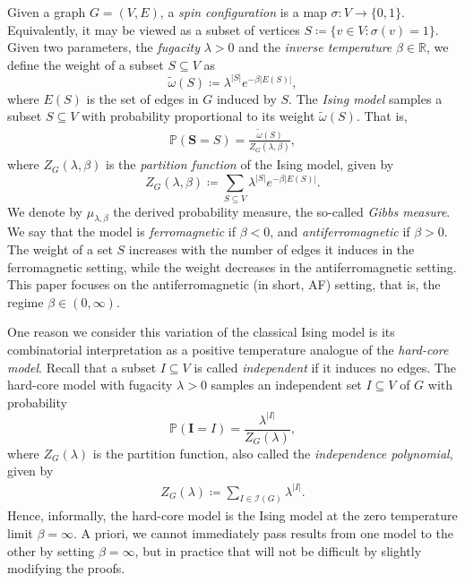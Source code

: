 \documentclass[reqno,a4paper,11pt]{amsart}
\newcommand{\cI}{\mathcal{I}}
\newcommand{\bI}{\mathbf{I}}
\newcommand{\lam}{\lambda}
\begin{document}
Given a graph $G=(V, E)$, a \textit{spin configuration} is a map $\sigma: V \to \{0, 1\}$. Equivalently, it may be viewed as a subset of vertices $S \coloneqq \{v\in V:\sigma(v)=1\}$. Given two parameters, the \textit{fugacity} $\lambda >0$ and the \textit{inverse temperature} $\beta \in \mathbb{R}$, we define the weight of a subset $S \subseteq V$ as
\[
\tilde{\omega}(S) \coloneqq \lambda^{|S|} e^{- \beta |E(S)|},
\]
where $E(S)$ is the set of edges in $G$ induced by $S$. The \textit{Ising model} samples a subset $S \subseteq V$ with probability proportional to its weight $\tilde{\omega}(S)$. That is,
\begin{align} \label{eq:Ising_distribution}
\mathbb{P}(\mathbf{S}=S)=\frac{\tilde{\omega}(S)}{Z_G(\lambda, \beta)},
\end{align}
where $Z_G(\lam,\beta)$ is the \emph{partition function} of the Ising model, given by
\[
Z_G(\lambda, \beta) \coloneqq \sum_{S \subseteq V} \lambda^{|S|} e^{- \beta |E(S)|}.
\]
We denote by $\mu_{\lam,\beta}$ the derived probability measure, the so-called \textit{Gibbs measure}. We say that the model is \emph{ferromagnetic} if $\beta<0$, and \textit{antiferromagnetic} if $\beta>0$. The weight of a set $S$ increases with the number of edges it induces in the ferromagnetic setting, while the weight decreases in the antiferromagnetic setting. This paper focuses on the antiferromagnetic (in short, AF) setting, that is, the regime $\beta \in (0, \infty)$.

One reason we consider this variation of the classical Ising model is its combinatorial interpretation as a positive temperature analogue of the \textit{hard-core model}. Recall that a subset $I \subseteq V$ is called \textit{independent} if it induces no edges. The hard-core model with fugacity $\lam>0$ samples an independent set $I \subseteq V$ of $G$ with probability
$$\mathbb{P}(\bI=I)=\frac{\lam^{|I|}}{Z_G(\lam)},$$
where $Z_G(\lam)$ is the partition function, also called the \textit{independence polynomial}, given by
\begin{align*}
    Z_G(\lam) \coloneqq \sum_{I\in\cI(G)}\lam^{|I|}.
\end{align*}
Hence, informally, the hard-core model is the Ising model at the zero temperature limit $\beta=\infty$. A priori, we cannot immediately pass results from one model to the other by setting $\beta=\infty$, but in practice that will not be difficult by slightly modifying the proofs.
\end{document}
